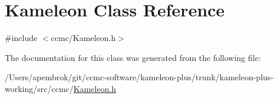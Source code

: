 \hypertarget{class_kameleon}{\section{Kameleon Class Reference}
\label{class_kameleon}
}


{\ttfamily \#include $<$ccmc/\-Kameleon.\-h$>$}



The documentation for this class was generated from the following file\-:\begin{DoxyCompactItemize}
\item 
/\-Users/apembrok/git/ccmc-\/software/kameleon-\/plus/trunk/kameleon-\/plus-\/working/src/ccmc/\hyperlink{_kameleon_8h}{Kameleon.\-h}\end{DoxyCompactItemize}
